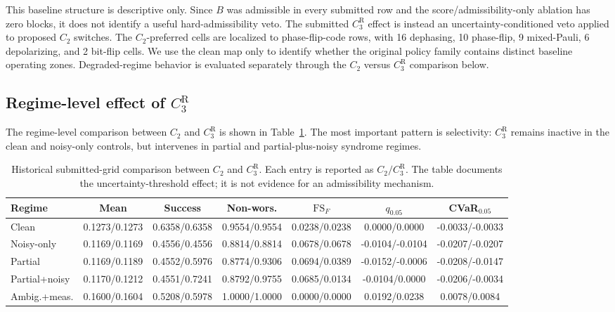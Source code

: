 \documentclass{iopjournal}
\begin{document}
This baseline structure is descriptive only.  Since $B$ was admissible in every
submitted row and the score/admissibility-only ablation has zero blocks, it does
not identify a useful hard-admissibility veto.  The submitted $C_3^{\mathrm R}$
effect is instead an uncertainty-conditioned veto applied to proposed $C_2$
switches.
The $C_2$-preferred cells are localized to phase-flip-code rows, with 16
dephasing, 10 phase-flip, 9 mixed-Pauli, 6 depolarizing, and 2 bit-flip cells.
We use the clean map only to identify whether the original policy family contains
distinct baseline operating zones. Degraded-regime behavior is evaluated
separately through the $C_2$ versus $C_3^{\mathrm R}$ comparison below.

\FloatBarrier

\subsection{Regime-level effect of \texorpdfstring{$C_3^{\mathrm R}$}{C3R}}\label{subsec:results-regime-effect}

The regime-level comparison between $C_2$ and $C_3^{\mathrm R}$ is shown in
Table~\ref{tab:c2-c3r-regime-metrics}. The most important pattern is selectivity:
$C_3^{\mathrm R}$ remains inactive in the clean and noisy-only controls, but
intervenes in partial and partial-plus-noisy syndrome regimes.

\begin{table}[t]
\caption{Historical submitted-grid comparison between $C_2$ and $C_3^{\mathrm R}$.
Each entry is reported as $C_2/C_3^{\mathrm R}$. The table documents the
uncertainty-threshold effect; it is not evidence for an admissibility mechanism.}
\label{tab:c2-c3r-regime-metrics}
\centering
\tiny
\setlength{\tabcolsep}{1.5pt}
\begin{tabular}{@{}lcccccc@{}}
\toprule
Regime & Mean & Success & Non-wors. & $\mathrm{FS}_F$ &
$q_{0.05}$ & CVaR$_{0.05}$ \\
\midrule
Clean &
0.1273/0.1273 & 0.6358/0.6358 & 0.9554/0.9554 &
0.0238/0.0238 & 0.0000/0.0000 & -0.0033/-0.0033 \\
Noisy-only &
0.1169/0.1169 & 0.4556/0.4556 & 0.8814/0.8814 &
0.0678/0.0678 & -0.0104/-0.0104 & -0.0207/-0.0207 \\
Partial &
0.1169/0.1189 & 0.4552/0.5976 & 0.8774/0.9306 &
0.0694/0.0389 & -0.0152/-0.0006 & -0.0208/-0.0147 \\
Partial+noisy &
0.1170/0.1212 & 0.4551/0.7241 & 0.8792/0.9755 &
0.0685/0.0134 & -0.0104/0.0000 & -0.0206/-0.0034 \\
Ambig.+meas. &
0.1600/0.1604 & 0.5208/0.5978 & 1.0000/1.0000 &
0.0000/0.0000 & 0.0192/0.0238 & 0.0078/0.0084 \\
\bottomrule
\end{tabular}
\end{table}
\end{document}
